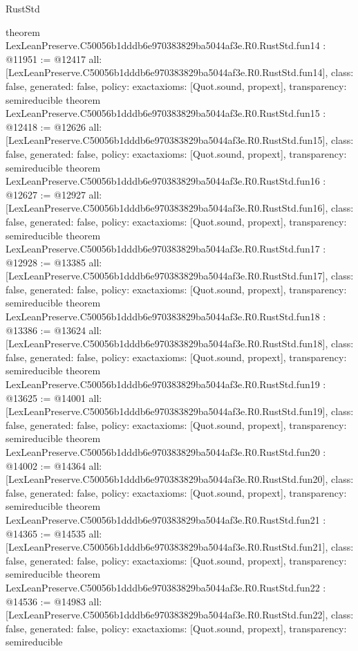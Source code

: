 \begin{lexlean}{RustStd}
\begin{coremodule}
{}
theorem LexLeanPreserve.C50056b1dddb6e970383829ba5044af3e.R0.RustStd.fun14 : @11951 := @12417 {
  all: [LexLeanPreserve.C50056b1dddb6e970383829ba5044af3e.R0.RustStd.fun14],
  class: false,
  generated: false,
  policy: exact{axioms: [Quot.sound, propext]},
  transparency: semireducible
}
theorem LexLeanPreserve.C50056b1dddb6e970383829ba5044af3e.R0.RustStd.fun15 : @12418 := @12626 {
  all: [LexLeanPreserve.C50056b1dddb6e970383829ba5044af3e.R0.RustStd.fun15],
  class: false,
  generated: false,
  policy: exact{axioms: [Quot.sound, propext]},
  transparency: semireducible
}
theorem LexLeanPreserve.C50056b1dddb6e970383829ba5044af3e.R0.RustStd.fun16 : @12627 := @12927 {
  all: [LexLeanPreserve.C50056b1dddb6e970383829ba5044af3e.R0.RustStd.fun16],
  class: false,
  generated: false,
  policy: exact{axioms: [Quot.sound, propext]},
  transparency: semireducible
}
theorem LexLeanPreserve.C50056b1dddb6e970383829ba5044af3e.R0.RustStd.fun17 : @12928 := @13385 {
  all: [LexLeanPreserve.C50056b1dddb6e970383829ba5044af3e.R0.RustStd.fun17],
  class: false,
  generated: false,
  policy: exact{axioms: [Quot.sound, propext]},
  transparency: semireducible
}
theorem LexLeanPreserve.C50056b1dddb6e970383829ba5044af3e.R0.RustStd.fun18 : @13386 := @13624 {
  all: [LexLeanPreserve.C50056b1dddb6e970383829ba5044af3e.R0.RustStd.fun18],
  class: false,
  generated: false,
  policy: exact{axioms: [Quot.sound, propext]},
  transparency: semireducible
}
theorem LexLeanPreserve.C50056b1dddb6e970383829ba5044af3e.R0.RustStd.fun19 : @13625 := @14001 {
  all: [LexLeanPreserve.C50056b1dddb6e970383829ba5044af3e.R0.RustStd.fun19],
  class: false,
  generated: false,
  policy: exact{axioms: [Quot.sound, propext]},
  transparency: semireducible
}
theorem LexLeanPreserve.C50056b1dddb6e970383829ba5044af3e.R0.RustStd.fun20 : @14002 := @14364 {
  all: [LexLeanPreserve.C50056b1dddb6e970383829ba5044af3e.R0.RustStd.fun20],
  class: false,
  generated: false,
  policy: exact{axioms: [Quot.sound, propext]},
  transparency: semireducible
}
theorem LexLeanPreserve.C50056b1dddb6e970383829ba5044af3e.R0.RustStd.fun21 : @14365 := @14535 {
  all: [LexLeanPreserve.C50056b1dddb6e970383829ba5044af3e.R0.RustStd.fun21],
  class: false,
  generated: false,
  policy: exact{axioms: [Quot.sound, propext]},
  transparency: semireducible
}
theorem LexLeanPreserve.C50056b1dddb6e970383829ba5044af3e.R0.RustStd.fun22 : @14536 := @14983 {
  all: [LexLeanPreserve.C50056b1dddb6e970383829ba5044af3e.R0.RustStd.fun22],
  class: false,
  generated: false,
  policy: exact{axioms: [Quot.sound, propext]},
  transparency: semireducible
}
\end{coremodule}
\end{lexlean}
